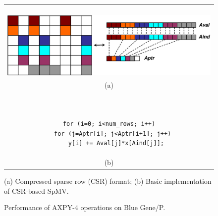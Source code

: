 \begin{figure}%
\begin{tabular}{c}
\begin{minipage}[t]{.43\textwidth}
\centering
\vspace{0.2in}
~~~~~~~~\includegraphics[width=1.0\textwidth]{figures/spmv.eps}  
\end{minipage}
\\
(a)
\\
\begin{minipage}[t]{.3\textwidth}
\scriptsize
\begin{verbatim}


for (i=0; i<num_rows; i++)
  for (j=Aptr[i]; j<Aptr[i+1]; j++)
    y[i] += Aval[j]*x[Aind[j]];

\end{verbatim}
\end{minipage}
\\
(b)
\\
\end{tabular}

\caption{(a) Compressed sparse row (CSR) format; (b) Basic implementation of CSR-based SpMV.}
\label{fig:spmv}
\end{figure}


\begin{figure}%
\begin{center} 
\end{center}
\caption{Performance of AXPY-4 operations on Blue Gene/P.} 
\label{fig:axpy4-bgp-results} 
\end{figure} 




